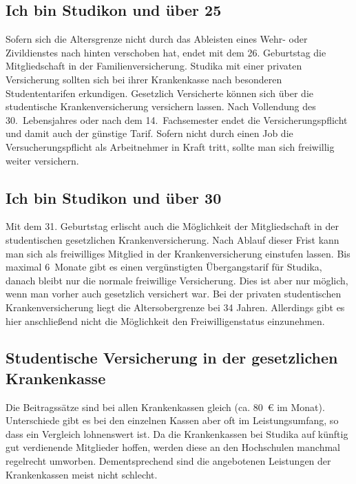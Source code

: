 \subsection*{Ich bin Studikon und über 25}

Sofern sich die Altersgrenze nicht durch das Ableisten eines Wehr-
oder Zivildienstes nach hinten verschoben hat, endet mit dem
26. Geburtstag die Mitgliedschaft in der Familienversicherung. 
Studika mit einer privaten Versicherung sollten sich bei ihrer
Krankenkasse nach besonderen Studententarifen erkundigen. Gesetzlich
Versicherte können sich über die studentische
Krankenversicherung versichern lassen. Nach Vollendung des 30.~Lebensjahres
oder nach dem 14.~Fachsemester endet die Versicherungspflicht und damit
auch der günstige Tarif. Sofern nicht durch einen Job die Versucherungspflicht
als Arbeitnehmer in Kraft tritt, sollte man sich freiwillig
weiter versichern.

\subsection*{Ich bin Studikon und über 30}

Mit dem 31. Geburtstag erlischt auch die Möglichkeit der
Mitgliedschaft in der studentischen gesetzlichen
Krankenversicherung. Nach Ablauf dieser Frist kann man sich 
als freiwilliges Mitglied in der Krankenversicherung einstufen lassen. 
Bis maximal 6~Monate gibt es einen vergünstigten Übergangstarif für
Studika, danach bleibt nur die normale freiwillige Versicherung.
Dies ist aber nur möglich, wenn
man vorher auch gesetzlich versichert war. Bei der privaten
studentischen Krankenversicherung liegt die Altersobergrenze bei 34
Jahren. Allerdings gibt es hier anschließend nicht die Möglichkeit den
Freiwilligenstatus einzunehmen.

\subsection*{Studentische Versicherung in der gesetzlichen Krankenkasse}

Die Beitragssätze sind bei allen Krankenkassen gleich (ca. 80~€ im
Monat). Unterschiede gibt es bei den einzelnen Kassen aber oft im
Leistungsumfang, so dass ein Vergleich lohnenswert ist. Da die Krankenkassen bei
Studika auf künftig gut verdienende Mitglieder hoffen, werden
diese an den Hochschulen manchmal regelrecht umworben. Dementsprechend
sind die angebotenen Leistungen der Krankenkassen meist nicht
schlecht.

